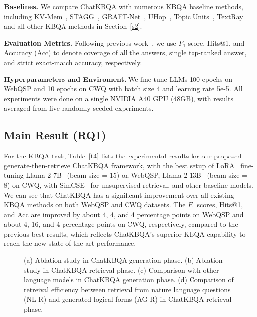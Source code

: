 \documentclass{article} \usepackage{iclr2024_conference,times}
\begin{document}
\textbf{Baselines. } We compare ChatKBQA with numerous KBQA baseline methods, including KV-Mem~\citep{KV-Mem}, STAGG~\citep{STAGG}, GRAFT-Net~\citep{GRAFT-Net}, UHop~\citep{UHop}, Topic Units~\citep{TopicUnits}, TextRay~\citep{TextRay} and all other KBQA methods in Section~\ref{s2}. 



\textbf{Evaluation Metrics. }
Following previous work~\citep{GMT-KBQA,TIARA,DECAF}, we use $F_1$ score, Hits@1, and Accuracy (Acc) to denote coverage of all the answers, single top-ranked answer, and strict exact-match accuracy, respectively.

\textbf{Hyperparameters and Enviroment. }
We fine-tune LLMs 100 epochs on WebQSP and 10 epochs on CWQ with batch size 4 and learning rate 5e-5. All experiments were done on a single NVIDIA A40 GPU (48GB), with results averaged from five randomly seeded experiments. 



\subsection{Main Result (RQ1)}

For the KBQA task, Table~\ref{t4} lists the experimental results for our proposed generate-then-retrieve ChatKBQA framework, with the best setup of LoRA~\citep{LoRA} fine-tuning Llama-2-7B~\citep{Llama2} (beam size = 15) on WebQSP, Llama-2-13B~\citep{Llama2} (beam size = 8) on CWQ, with SimCSE~\citep{SimCSE} for unsupervised retrieval, and other baseline models. We can see that ChatKBQA has a significant improvement over all existing KBQA methods on both WebQSP and CWQ datasets. The $F_1$ scores, Hits@1, and Acc are improved by about 4, 4, and 4 percentage points on WebQSP and about 4, 16, and 4 percentage points on CWQ, respectively, compared to the previous best results, which reflects ChatKBQA's superior KBQA capability to reach the new state-of-the-art performance.



\begin{figure}[h!t]
    \vspace{-3mm}
    \centering
	\caption{(a) Ablation study in ChatKBQA generation phase. (b) Ablation study in ChatKBQA retrieval phase. (c) Comparison with other language models in ChatKBQA generation phase. (d) Comparison of retreival efficiency between retrieval from nature language questions (NL-R) and generated logical forms (AG-R) in ChatKBQA retrieval phase.}
	\label{f3}
\end{figure}
\end{document}
